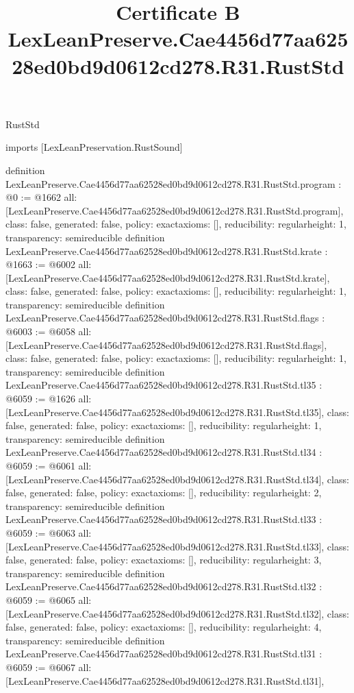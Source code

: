 \begin{lexlean}{RustStd}
\title{Certificate B LexLeanPreserve.Cae4456d77aa62528ed0bd9d0612cd278.R31.RustStd}
\begin{coremodule}
imports [LexLeanPreservation.RustSound]

definition LexLeanPreserve.Cae4456d77aa62528ed0bd9d0612cd278.R31.RustStd.program : @0 := @1662 {
  all: [LexLeanPreserve.Cae4456d77aa62528ed0bd9d0612cd278.R31.RustStd.program],
  class: false,
  generated: false,
  policy: exact{axioms: []},
  reducibility: regular{height: 1},
  transparency: semireducible
}
definition LexLeanPreserve.Cae4456d77aa62528ed0bd9d0612cd278.R31.RustStd.krate : @1663 := @6002 {
  all: [LexLeanPreserve.Cae4456d77aa62528ed0bd9d0612cd278.R31.RustStd.krate],
  class: false,
  generated: false,
  policy: exact{axioms: []},
  reducibility: regular{height: 1},
  transparency: semireducible
}
definition LexLeanPreserve.Cae4456d77aa62528ed0bd9d0612cd278.R31.RustStd.flags : @6003 := @6058 {
  all: [LexLeanPreserve.Cae4456d77aa62528ed0bd9d0612cd278.R31.RustStd.flags],
  class: false,
  generated: false,
  policy: exact{axioms: []},
  reducibility: regular{height: 1},
  transparency: semireducible
}
definition LexLeanPreserve.Cae4456d77aa62528ed0bd9d0612cd278.R31.RustStd.tl35 : @6059 := @1626 {
  all: [LexLeanPreserve.Cae4456d77aa62528ed0bd9d0612cd278.R31.RustStd.tl35],
  class: false,
  generated: false,
  policy: exact{axioms: []},
  reducibility: regular{height: 1},
  transparency: semireducible
}
definition LexLeanPreserve.Cae4456d77aa62528ed0bd9d0612cd278.R31.RustStd.tl34 : @6059 := @6061 {
  all: [LexLeanPreserve.Cae4456d77aa62528ed0bd9d0612cd278.R31.RustStd.tl34],
  class: false,
  generated: false,
  policy: exact{axioms: []},
  reducibility: regular{height: 2},
  transparency: semireducible
}
definition LexLeanPreserve.Cae4456d77aa62528ed0bd9d0612cd278.R31.RustStd.tl33 : @6059 := @6063 {
  all: [LexLeanPreserve.Cae4456d77aa62528ed0bd9d0612cd278.R31.RustStd.tl33],
  class: false,
  generated: false,
  policy: exact{axioms: []},
  reducibility: regular{height: 3},
  transparency: semireducible
}
definition LexLeanPreserve.Cae4456d77aa62528ed0bd9d0612cd278.R31.RustStd.tl32 : @6059 := @6065 {
  all: [LexLeanPreserve.Cae4456d77aa62528ed0bd9d0612cd278.R31.RustStd.tl32],
  class: false,
  generated: false,
  policy: exact{axioms: []},
  reducibility: regular{height: 4},
  transparency: semireducible
}
definition LexLeanPreserve.Cae4456d77aa62528ed0bd9d0612cd278.R31.RustStd.tl31 : @6059 := @6067 {
  all: [LexLeanPreserve.Cae4456d77aa62528ed0bd9d0612cd278.R31.RustStd.tl31],
}
\end{coremodule}
\end{lexlean}
